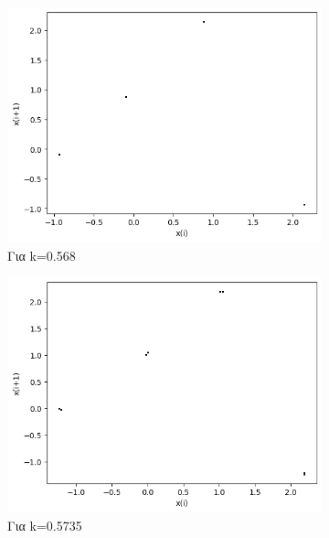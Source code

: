 \begin{figure}[h!]
\begin{subfigure}[c]{0.4\textwidth}
		\includegraphics[width=\textwidth]{LateX images/graphs/k0568}
		\caption{Για k=0.568}
		\label{f:k12}
	\end{subfigure}
	\hfill
	\begin{subfigure}[c]{0.4\textwidth}
		\centering
		\includegraphics[width=\textwidth]{LateX images/graphs/k05735}
		\caption{Για k=0.5735}
		\label{f:k13}
	\end{subfigure}
	\hfill
	\begin{subfigure}[c]{0.4\textwidth}
		\centering

\end{subfigure}
\end{figure}
